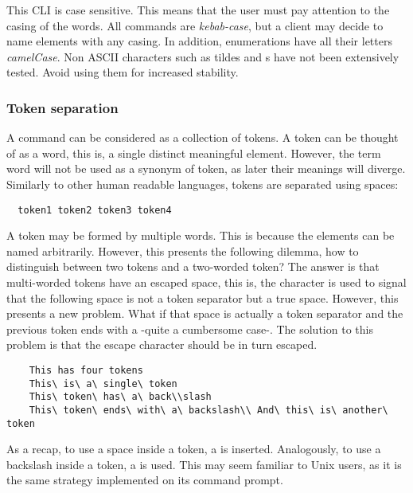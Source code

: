 \documentclass[../main.tex]{subfiles}
\begin{document}
This CLI is case sensitive. This means that the user must pay attention to the casing of the words. All commands are \textit{kebab-case}, but a client may decide to name elements with any casing. In addition, enumerations have all their letters \textit{camelCase}. Non ASCII characters such as tildes and s have not been extensively tested. Avoid using them for increased stability.\newline

\subsubsection{Token separation}
A command can be considered as a collection of tokens. A token can be thought of as a word, this is, a single distinct meaningful element. However, the term word will not be used as a synonym of token, as later their meanings will diverge. Similarly to other human readable languages, tokens are separated using spaces:

\begin{lstlisting}
  token1 token2 token3 token4
\end{lstlisting}

A token may be formed by multiple words. This is because the elements can be named arbitrarily. However, this presents the following dilemma, how to distinguish between two tokens and a two-worded token? The answer is that multi-worded tokens have an escaped space, this is, the character \textquote{\textbackslash} is used to signal that the following space is not a token separator but a true space. However, this presents a new problem. What if that space is actually a token separator and the previous token ends with a \textquote{\textbackslash} -quite a cumbersome case-. The solution to this problem is that the escape character should be in turn escaped. 

\begin{lstlisting}
    This has four tokens 
    This\ is\ a\ single\ token
    This\ token\ has\ a\ back\\slash
    This\ token\ ends\ with\ a\ backslash\\ And\ this\ is\ another\ token
\end{lstlisting}

As a recap, to use a space inside a token, a \textquote{\textbackslash\textvisiblespace} is inserted. Analogously, to use a backslash inside a token, a \textquote{\textbackslash\textbackslash} is used. This may seem familiar to Unix users, as it is the same strategy implemented on its command prompt.\newline
\end{document}
